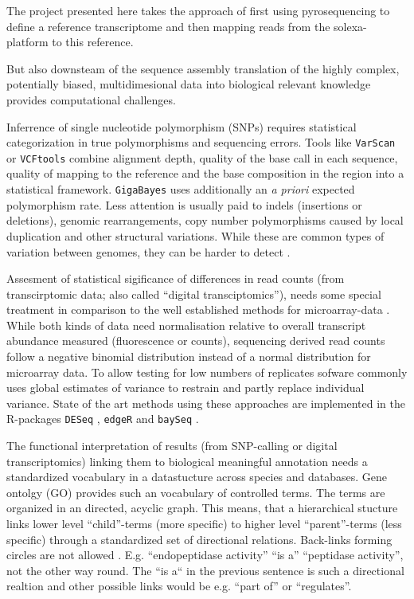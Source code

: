 The project presented here takes the approach of first using
pyrosequencing to define a reference transcriptome and then mapping
reads from the solexa-platform to this reference.

But also downsteam of the sequence assembly translation of the highly
complex, potentially biased, multidimesional data into biological
relevant knowledge provides computational challenges.

Inferrence of single nucleotide polymorphism (SNPs) requires
statistical categorization in true polymorphisms and sequencing
errors. Tools like \texttt{VarScan} \cite{pmid19542151} or
\texttt{VCFtools} \cite{pmid21653522} combine alignment depth, quality
of the base call in each sequence, quality of mapping to the reference
and the base composition in the region into a statistical
framework. \texttt{GigaBayes} \cite{pmid18204455} uses additionally an
\textit{a priori} expected polymorphism rate. Less attention is
usually paid to indels (insertions or deletions), genomic
rearrangements, copy number polymorphisms caused by local duplication
and other structural variations. While these are common types of
variation between genomes, they can be harder to detect
\cite{pmid22084086}.

Assesment of statistical sigificance of differences in read counts
(from transcirptomic data; also called ``digital transciptomics''),
needs some special treatment in comparison to the well established
methods for microarray-data \cite{smyth2005limma}. While both kinds of
data need normalisation relative to overall transcript abundance
measured (fluorescence or counts), sequencing derived read counts
follow a negative binomial distribution \cite{pmid17728317} instead of
a normal distribution for microarray data. To allow testing for low
numbers of replicates sofware commonly uses global estimates of
variance to restrain and partly replace individual variance. State of
the art methods using these approaches are implemented in the
R-packages \texttt{DESeq} \cite{pmid20979621}, \texttt{edgeR}
\cite{pmid19910308} and \texttt{baySeq} \cite{pmid20698981}.

The functional interpretation of results (from SNP-calling or digital
transcriptomics) linking them to biological meaningful annotation
needs a standardized vocabulary in a datastucture across species and
databases. Gene ontolgy (GO) provides such an vocabulary of controlled
terms.  The terms are organized in an directed, acyclic graph. This
means, that a hierarchical stucture links lower level ``child''-terms
(more specific) to higher level ``parent''-terms (less specific)
through a standardized set of directional relations. Back-links
forming circles are not allowed
\cite{pmid10802651,pmid22123736}. E.g. ``endopeptidase activity'' ``is
a'' ``peptidase activity'', not the other way round. The ``is a`` in
the previous sentence is such a directional realtion and other
possible links would be e.g. ``part of'' or ``regulates''.


